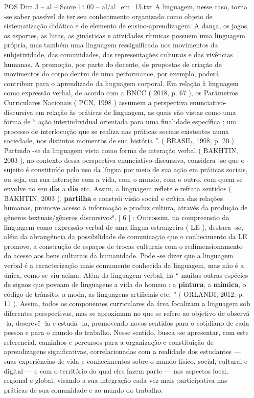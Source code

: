 \begin{textsample}{POS Dim 3 – al – Score 14.00 – al/al\_em\_15.txt}
A linguagem, nesse caso, torna -se saber passível de ter seu conhecimento organizado como objeto de sistematização didática e de elemento de ensino-aprendizagem.
A dança, os jogos, os esportes, as lutas, as ginásticas e atividades rítmicas possuem uma linguagem própria, mas também uma linguagem ressignificada nos movimentos da subjetividade, das comunidades, das representações culturais e das vivências humanas.
A promoção, por parte do docente, de propostas de criação de movimentos do corpo dentro de uma performance, por exemplo, poderá contribuir para o aprendizado da linguagem corporal.
Em relação à linguagem como expressão verbal, de acordo com a BNCC ( 2018, p. 67 ), os Parâmetros Curriculares Nacionais ( PCN, 1998 ) assumem a perspectiva enunciativo-discursiva em relação às práticas de linguagem, as quais são vistas como uma forma de “ ação interindividual orientada para uma finalidade específica ; um processo de interlocução que se realiza nas práticas sociais existentes numa sociedade, nos distintos momentos de sua história ”. ( BRASIL, 1998, p. 20 ) Partindo -se da linguagem vista como forma de interação verbal ( BAKHTIN, 2003 ), no contexto dessa perspectiva enunciativo-discursiva, considera -se que o sujeito é constituído pelo uso da língua por meio de sua ação em práticas sociais, ou seja, em sua interação com a vida, com o mundo, com o outro, com quem se envolve no seu \textbf{dia} a \textbf{dia} etc.
Assim, a linguagem reflete e refrata sentidos ( BAKHTIN, 2003 ), \textbf{partilha} e constrói visão social e crítica das relações humanas, promove acesso à informação e produz cultura, através da produção de gêneros textuais/gêneros discursivos⁶. [ 6 ] : Outrossim, na compreensão da linguagem como expressão verbal de uma língua estrangeira ( LE ), destaca -se, além da abrangência da possibilidade de comunicação que o conhecimento da LE promove, a construção de espaços de trocas culturais com o redimensionamento do acesso aos bens culturais da humanidade.
Pode -se dizer que a linguagem verbal é a caracterização mais comumente conhecida da linguagem, mas não é a única, como se viu acima.
Além da linguagem verbal, há “ muitas outras espécies de signos que povoam de linguagens a vida do homem : a \textbf{pintura}, a \textbf{mímica}, o código de trânsito, a moda, as linguagens artificiais etc. ” ( ORLANDI, 2012, p. 11 ).
Assim, todos os componentes curriculares da área focalizam a linguagem sob diferentes perspectivas, mas se aproximam no que se refere ao objetivo de observá -la, descrevê -la e estudá -la, promovendo novos sentidos para o cotidiano de cada pessoa e para o mundo do trabalho.
Nesse sentido, busca -se apresentar, com este referencial, caminhos e percursos para a organização e constituição de aprendizagens significativas, correlacionadas com a realidade dos estudantes — suas experiências de vida e conhecimentos sobre o mundo físico, social, cultural e digital — e com o território do qual eles fazem parte — nos aspectos local, regional e global, visando a sua integração cada vez mais participativa nas práticas de sua comunidade e ao mundo do trabalho.

\end{textsample}
